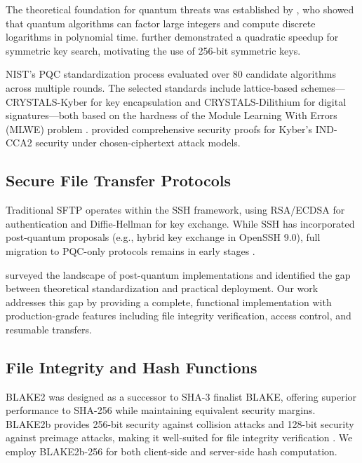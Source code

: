 \documentclass[12pt, a4paper]{article}
\begin{document}
The theoretical foundation for quantum threats was established by \textcite{shor1994algorithms}, who showed that quantum algorithms can factor large integers and compute discrete logarithms in polynomial time. \textcite{grover1996fast} further demonstrated a quadratic speedup for symmetric key search, motivating the use of 256-bit symmetric keys.

NIST's PQC standardization process evaluated over 80 candidate algorithms across multiple rounds. The selected standards include lattice-based schemes—CRYSTALS-Kyber for key encapsulation and CRYSTALS-Dilithium for digital signatures—both based on the hardness of the Module Learning With Errors (MLWE) problem \parencite{bos2018crystals, ducas2018crystals}. \textcite{avanzi2019crystals} provided comprehensive security proofs for Kyber's IND-CCA2 security under chosen-ciphertext attack models.

\subsection{Secure File Transfer Protocols}

Traditional SFTP \parencite{ylonen2006secure} operates within the SSH framework, using RSA/ECDSA for authentication and Diffie-Hellman for key exchange. While SSH has incorporated post-quantum proposals (e.g., hybrid key exchange in OpenSSH 9.0), full migration to PQC-only protocols remains in early stages \parencite{stebila2020hybrid}.

\textcite{bernstein2017post} surveyed the landscape of post-quantum implementations and identified the gap between theoretical standardization and practical deployment. Our work addresses this gap by providing a complete, functional implementation with production-grade features including file integrity verification, access control, and resumable transfers.

\subsection{File Integrity and Hash Functions}

BLAKE2 \parencite{aumasson2013blake2} was designed as a successor to SHA-3 finalist BLAKE, offering superior performance to SHA-256 while maintaining equivalent security margins. BLAKE2b provides 256-bit security against collision attacks and 128-bit security against preimage attacks, making it well-suited for file integrity verification \parencite{aumasson2013blake2}. We employ BLAKE2b-256 for both client-side and server-side hash computation.
\end{document}
